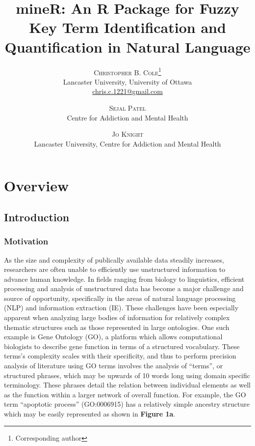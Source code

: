 \documentclass[twoside]{article}
\title{mineR: An R Package for Fuzzy Key Term Identification and Quantification in Natural Language} %
\author{%
\textsc{Christopher B. Cole}\thanks{Corresponding author} \\[1ex] %
\normalsize Lancaster University, University of Ottawa \\ %
\normalsize \href{mailto:chris.c.1221@gmail.com}{chris.c.1221@gmail.com} %
\and %
\textsc{Sejal Patel} \\[1ex] %
\normalsize Centre for Addiction and Mental Health \\ %
\and %
\textsc{Jo Knight} \\[1ex] %
\normalsize Lancaster University, Centre for Addiction and Mental Health \\ %
}
\begin{document}
\maketitle

\section{Overview}

\subsection{Introduction}

\subsubsection{Motivation}

As the size and complexity of publically available data steadily increases, researchers are often unable to efficiently use unstructured information to advance human knowledge.  In fields ranging from biology to linguistics, efficient processing and analysis of unstructured data has become a major challenge and source of opportunity, specifically in the areas of natural language processing (NLP) and information extraction (IE). These challenges have been especially apparent when analyzing large bodies of information for relatively complex thematic structures such as those represented in large ontologies. One such example is Gene Ontology (GO), a platform which allows computational biologists to describe gene function in terms of a structured vocabulary. These terms's complexity scales with their specificity, and thus to perform precision analysis of literature using GO terms involves the analysis of ``terms'', or structured phrases, which may be upwards of 10 words long using domain specific terminology. These phrases detail the relation between individual elements as well as the function within a larger network of overall function.  For example, the GO term ``apoptotic process'' (GO:0006915) has a relatively simple ancestry structure which may be easily represented as shown in \textbf{Figure 1a}.
\end{document}
